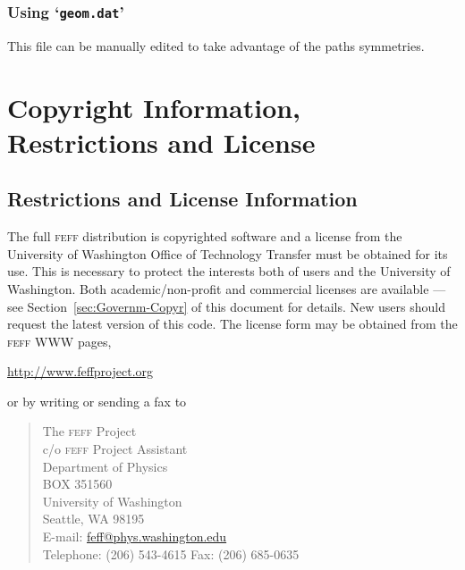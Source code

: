 \documentclass[11pt,oneside]{report} %
\renewcommand{\htmladdnormallink}[2]{\href{#2}{#1}}
\newcommand{\program}[1]{\textsc{#1}}
\newcommand{\feff}{\program{feff}}
\newcommand{\file}[1]{`\texttt{#1}'}
\begin{document}
\begin{latexonly}
\subsection{Using \file{geom.dat}}
\label{sec:geom.dat}

This file can be manually edited to take advantage of the paths
symmetries. %










\appendix

\chapter{Copyright Information,  Restrictions and License}
\label{sec:Append-A-Copyr}

\section{Restrictions and License Information}
\label{sec:Restr-License-Inform}

The full {\feff} distribution is copyrighted software and a
license from the University of
Washington Office of Technology Transfer must be obtained for its use.
This is necessary to protect the interests both of users and the
University of Washington. Both academic/non-profit and commercial
licenses are available --- see Section~\ref{sec:Governm-Copyr}
of this document for details. New users should request the latest
version of this code. The license form may be
obtained from the {\feff} WWW pages,

\centerline{\htmladdnormallink{http://www.feffproject.org}
  {http://www.feffproject.org}}

\noindent or by writing or sending a fax to
\begin{quotation}
\noindent The {\feff} Project\\
c/o {\feff} Project Assistant\\
Department of Physics\\
BOX 351560\\
University of Washington\\
Seattle, WA 98195\\[2ex]
E-mail: \htmladdnormallink{feff@phys.washington.edu}
{mailto:feff@phys.washington.edu}\\
Telephone: (206) 543-4615
Fax: (206) 685-0635 
\end{quotation}



\end{latexonly}
\end{document}
